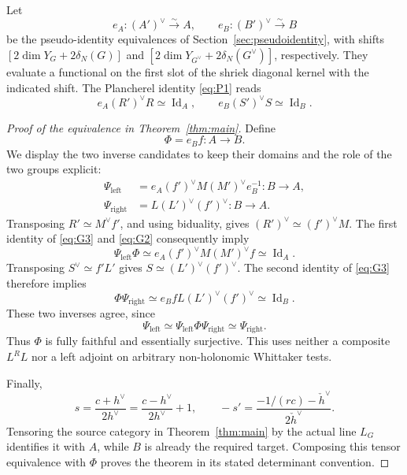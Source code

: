 \documentclass[11pt]{article}
\numberwithin{equation}{section}
\theoremstyle{definition}
\theoremstyle{remark}
\begin{document}
Let
\[
 e_A:(A')^\vee\xrightarrow{\sim}A,
 \qquad e_B:(B')^\vee\xrightarrow{\sim}B
\]
be the pseudo-identity equivalences of Section~\ref{sec:pseudoidentity},
with shifts \([2\dim Y_G+2\delta_N(G)]\) and
\([2\dim Y_{G^\vee}+2\delta_N(G^\vee)]\), respectively.  They evaluate
a functional on the first slot of the shriek diagonal kernel with the
indicated shift.  The Plancherel identity \eqref{eq:P1} reads
\begin{equation}\label{eq:G3}
 e_A(R')^\vee R\simeq\operatorname{Id}_A,
 \qquad
 e_B(S')^\vee S\simeq\operatorname{Id}_B.
\end{equation}

\begin{proof}[Proof of the equivalence in Theorem~\ref{thm:main}]
Define
\begin{equation}\label{eq:G4}
 \Phi=e_Bf:A\longrightarrow B.
\end{equation}
We display the two inverse candidates to keep their domains and the
role of the two groups explicit:
\[
 \begin{aligned}
 \Psi_{\mathrm{left}}
   &=e_A(f')^\vee M(M')^\vee e_B^{-1}:B\longrightarrow A,\\
 \Psi_{\mathrm{right}}
   &=L(L')^\vee(f')^\vee:B\longrightarrow A.
 \end{aligned}
\]
Transposing \(R'\simeq M^\vee f'\), and using biduality, gives
\((R')^\vee\simeq(f')^\vee M\).  The first identity of
\eqref{eq:G3} and \eqref{eq:G2} consequently imply
\[
 \Psi_{\mathrm{left}}\Phi
 \simeq e_A(f')^\vee M(M')^\vee f
 \simeq\operatorname{Id}_A.
\]
Transposing \(S^\vee\simeq f'L'\) gives
\(S\simeq(L')^\vee(f')^\vee\).  The second identity of
\eqref{eq:G3} therefore implies
\[
 \Phi\Psi_{\mathrm{right}}
 \simeq e_BfL(L')^\vee(f')^\vee
 \simeq\operatorname{Id}_B.
\]
These two inverses agree, since
\[
 \Psi_{\mathrm{left}}
 \simeq\Psi_{\mathrm{left}}\Phi\Psi_{\mathrm{right}}
 \simeq\Psi_{\mathrm{right}}.
\]
Thus \(\Phi\) is fully faithful and essentially surjective.  This uses
neither a composite \(L^RL\) nor a left adjoint on arbitrary
non-holonomic Whittaker tests.

Finally,
\[
 s=\frac{c+h^\vee}{2h^\vee}
   =\frac{c-h^\vee}{2h^\vee}+1,
 \qquad
 -s'=\frac{-1/(rc)-\check h^\vee}{2\check h^\vee}.
\]
Tensoring the source category in Theorem~\ref{thm:main} by the actual
line \(L_G\) identifies it with \(A\), while \(B\) is already the
required target.  Composing this tensor equivalence with \(\Phi\)
proves the theorem in its stated determinant convention.
\end{proof}
\end{document}
